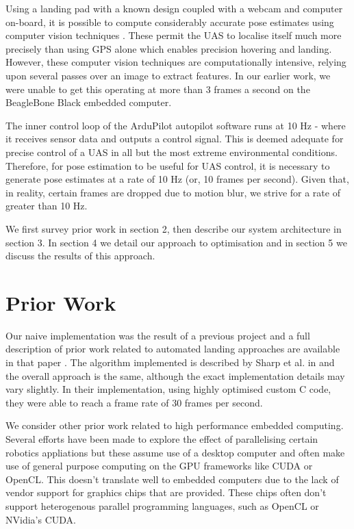 \documentclass{acm_proc_article-sp}
\begin{document}
Using a landing pad with a known design coupled with a webcam and computer on-board, it is possible to compute considerably accurate pose estimates using computer vision techniques \cite{berzanaccurate}. These permit the UAS to localise itself much more precisely than using GPS alone which enables precision hovering and landing. However, these computer vision techniques are computationally intensive, relying upon several passes over an image to extract features. In our earlier work, we were unable to get this operating at more than 3 frames a second on the BeagleBone Black embedded computer. 

The inner control loop of the ArduPilot autopilot software runs at 10 Hz - where it receives sensor data and outputs a control signal. This is deemed adequate for precise control of a UAS in all but the most extreme environmental conditions. Therefore, for pose estimation to be useful for UAS control, it is necessary to generate pose estimates at a rate of 10 Hz (or, 10 frames per second). Given that, in reality, certain frames are dropped due to motion blur, we strive for a rate of greater than 10 Hz.

We first survey prior work in section 2, then describe our system architecture in section 3. In section 4 we detail our approach to optimisation and in section 5 we discuss the results of this approach.

\section{Prior Work\label{prior-work}}
Our naive implementation was the result of a previous project and a full description of prior work related to automated landing approaches are available in that paper \cite{berzanaccurate}. The algorithm implemented is described by Sharp et al. in \cite{sharp_et_al_2001} and the overall approach is the same, although the exact implementation details may vary slightly. In their implementation, using highly optimised custom C code, they were able to reach a frame rate of 30 frames per second. 

We consider other prior work related to high performance embedded computing. Several efforts have been made to explore the effect of parallelising certain robotics appliations but these assume use of a desktop computer and often make use of general purpose computing on the GPU frameworks like CUDA or OpenCL. This doesn't translate well to embedded computers due to the lack of vendor support for graphics chips that are provided. These chips often don't support heterogenous parallel programming languages, such as OpenCL or NVidia's CUDA. 
\end{document}
